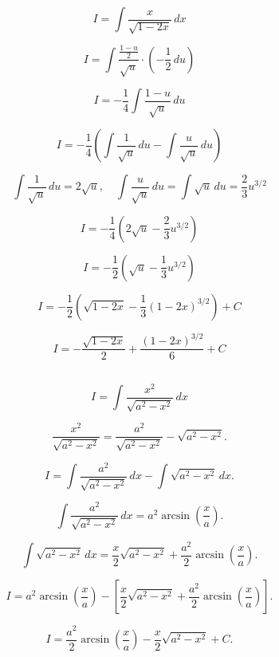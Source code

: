 \documentclass[12pt]{article}
\begin{document}
	

	\[
	I = \int \frac{x}{\sqrt{1-2x}} \, dx
	\]
	

	\[
	I = \int \frac{\frac{1 - u}{2}}{\sqrt{u}} \cdot \left( -\frac{1}{2} \, du \right)
	\]
	

	\[
	I = -\frac{1}{4} \int \frac{1 - u}{\sqrt{u}} \, du
	\]
	

	\[
	I = -\frac{1}{4} \left( \int \frac{1}{\sqrt{u}} \, du - \int \frac{u}{\sqrt{u}} \, du \right)
	\]
	

	\[
	\int \frac{1}{\sqrt{u}} \, du = 2\sqrt{u}, \quad \int \frac{u}{\sqrt{u}} \, du = \int \sqrt{u} \, du = \frac{2}{3} u^{3/2}
	\]
	

	\[
	I = -\frac{1}{4} \left( 2\sqrt{u} - \frac{2}{3} u^{3/2} \right)
	\]
	

	\[
	I = -\frac{1}{2} \left( \sqrt{u} - \frac{1}{3} u^{3/2} \right)
	\]
	

	\[
	I = -\frac{1}{2} \left( \sqrt{1-2x} - \frac{1}{3} (1-2x)^{3/2} \right) + C
	\]
	

	\[
	I = -\frac{\sqrt{1-2x}}{2} + \frac{(1-2x)^{3/2}}{6} + C
	\]
	
\subsection{}	




	

	\[
	I = \int \frac{x^2}{\sqrt{a^2 - x^2}} \, dx
	\]
	

	\[
	\frac{x^2}{\sqrt{a^2 - x^2}} = \frac{a^2}{\sqrt{a^2 - x^2}} - \sqrt{a^2 - x^2}.
	\]
	

	\[
	I = \int \frac{a^2}{\sqrt{a^2 - x^2}} \, dx - \int \sqrt{a^2 - x^2} \, dx.
	\]
	

	\[
	\int \frac{a^2}{\sqrt{a^2 - x^2}} \, dx = a^2 \arcsin\left(\frac{x}{a}\right).
	\]
	

	\[
	\int \sqrt{a^2 - x^2} \, dx = \frac{x}{2} \sqrt{a^2 - x^2} + \frac{a^2}{2} \arcsin\left(\frac{x}{a}\right).
	\]
	

	\[
	I = a^2 \arcsin\left(\frac{x}{a}\right) - \left[\frac{x}{2} \sqrt{a^2 - x^2} + \frac{a^2}{2} \arcsin\left(\frac{x}{a}\right)\right].
	\]
	

	\[
	I = \frac{a^2}{2} \arcsin\left(\frac{x}{a}\right) - \frac{x}{2} \sqrt{a^2 - x^2} + C.
	\]
	
	
\subsection{}	
\end{document}
